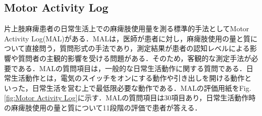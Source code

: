 \subsection*{Motor Activity Log}

片上肢麻痺患者の日常生活上での麻痺肢使用量を測る標準的手法としてMotor Activity Log(MAL)\cite{Taub2006,Uswatte2005,Uswatte2000}がある．MALは，医師が患者に対し，麻痺肢使用の量と質について直接問う，質問形式の手法であり，測定結果が患者の認知レベルによる影響や質問者の主観的影響を受ける問題がある．そのため，客観的な測定手法が必要である．MALの質問項目は，一般的な日常生活動作に関する質問である．日常生活動作とは，電気のスイッチをオンにする動作や引き出しを開ける動作といった，日常生活を営む上で最低限必要な動作である．MALの評価用紙をFig.\ref{fig:Motor Activity Log}に示す．MALの質問項目は30項目あり，日常生活動作時の麻痺肢使用の量と質について11段階の評価で患者が答える．

